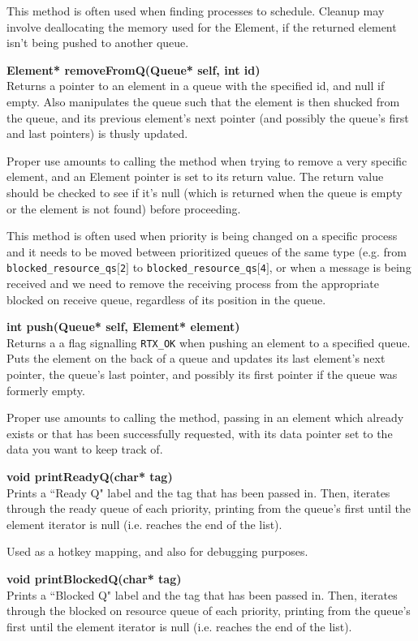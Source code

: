 \documentclass[11pt, oneside]{article}
\begin{document}
This method is often used when finding processes to schedule. Cleanup may involve deallocating the memory used for the Element, if the returned element isn't being pushed to another queue. 

{\bf Element* removeFromQ(Queue* self, int id)}\\
Returns a pointer to an element in a queue with the specified id, and null if empty. Also manipulates the queue such that the element is then shucked from the queue, and its previous element's next pointer (and possibly the queue's first and last pointers) is thusly updated.

Proper use amounts to calling the method when trying to remove a very specific element, and an Element pointer is set to its return value. The return value should be checked to see if it's null (which is returned when the queue is empty or the element is not found) before proceeding.

This method is often used when priority is being changed on a specific process and it needs to be moved between prioritized queues of the same type (e.g. from {\tt blocked\_resource\_qs$[$2$]$} to {\tt blocked\_resource\_qs$[$4$]$}, or when a message is being received and we need to remove the receiving process from the appropriate blocked on receive queue, regardless of its position in the queue.
 
{\bf int push(Queue* self, Element* element)}\\
Returns a a flag signalling {\tt RTX\_OK} when pushing an element to a specified queue. Puts the element on the back of a queue and updates its last element's next pointer, the queue's last pointer, and possibly its first pointer if the queue was formerly empty.

Proper use amounts to calling the method, passing in an element which already exists or that has been successfully requested, with its data pointer set to the data you want to keep track of.


{\bf void printReadyQ(char* tag)}\\
Prints a ``Ready Q" label and the tag that has been passed in. Then, iterates through the ready queue of each priority, printing from the queue's first until the element iterator is null (i.e. reaches the end of the list).

Used as a hotkey mapping, and also for debugging purposes.

{\bf void printBlockedQ(char* tag)}\\
Prints a ``Blocked Q" label and the tag that has been passed in. Then, iterates through the blocked on resource queue of each priority, printing from the queue's first until the element iterator is null (i.e. reaches the end of the list).
\end{document}
